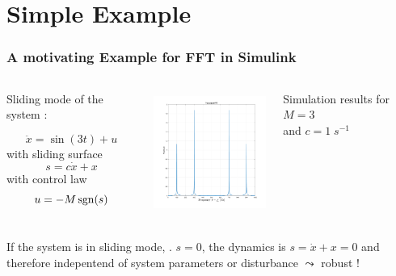 \section{Simple Example}
\begin{frame}
  \frametitle{A motivating Example for FFT in Simulink}

  
 \begin{columns}

   \begin{example}
     Sliding mode of the system \cite{utkin2020}:

      \begin{equation}
         \ddot x = \sin(3 t) + u 
       \end{equation}
       with sliding surface
       \begin{equation}
        s = c \dot x + x
       \end{equation}
       with control law
       \begin{equation}
         u = -M \sgn(s)
       \end{equation}
    \end{example}   
   \centering
   \includegraphics[height=4cm]{./Matlab/figures/FFTsimPlt.pdf}
   
   Simulation results for $M = 3$ \\ and $c = 1\; \unit{s}^{-1}$
\end{columns}

\vspace*{2mm}

  If the system is in sliding mode, \ie. $s=0$, the dynamics is
  $s = \dot x + x =0$ and therefore indepentend of system
  parameters or disturbance $\leadsto$ robust !

\end{frame}

